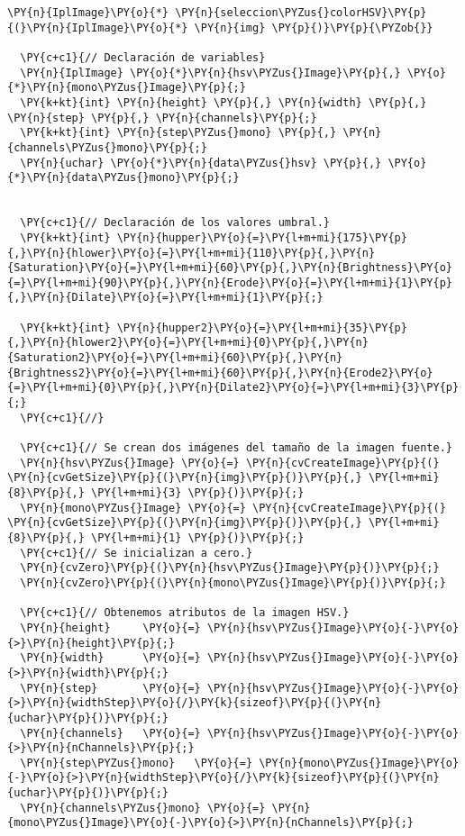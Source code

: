\begin{Verbatim}[commandchars=\\\{\}]
\PY{n}{IplImage}\PY{o}{*} \PY{n}{seleccion\PYZus{}colorHSV}\PY{p}{(}\PY{n}{IplImage}\PY{o}{*} \PY{n}{img} \PY{p}{)}\PY{p}{\PYZob{}}

  \PY{c+c1}{// Declaración de variables}
  \PY{n}{IplImage} \PY{o}{*}\PY{n}{hsv\PYZus{}Image}\PY{p}{,} \PY{o}{*}\PY{n}{mono\PYZus{}Image}\PY{p}{;}
  \PY{k+kt}{int} \PY{n}{height} \PY{p}{,} \PY{n}{width} \PY{p}{,} \PY{n}{step} \PY{p}{,} \PY{n}{channels}\PY{p}{;}
  \PY{k+kt}{int} \PY{n}{step\PYZus{}mono} \PY{p}{,} \PY{n}{channels\PYZus{}mono}\PY{p}{;}  
  \PY{n}{uchar} \PY{o}{*}\PY{n}{data\PYZus{}hsv} \PY{p}{,} \PY{o}{*}\PY{n}{data\PYZus{}mono}\PY{p}{;}


  \PY{c+c1}{// Declaración de los valores umbral.}
  \PY{k+kt}{int} \PY{n}{hupper}\PY{o}{=}\PY{l+m+mi}{175}\PY{p}{,}\PY{n}{hlower}\PY{o}{=}\PY{l+m+mi}{110}\PY{p}{,}\PY{n}{Saturation}\PY{o}{=}\PY{l+m+mi}{60}\PY{p}{,}\PY{n}{Brightness}\PY{o}{=}\PY{l+m+mi}{90}\PY{p}{,}\PY{n}{Erode}\PY{o}{=}\PY{l+m+mi}{1}\PY{p}{,}\PY{n}{Dilate}\PY{o}{=}\PY{l+m+mi}{1}\PY{p}{;}

  \PY{k+kt}{int} \PY{n}{hupper2}\PY{o}{=}\PY{l+m+mi}{35}\PY{p}{,}\PY{n}{hlower2}\PY{o}{=}\PY{l+m+mi}{0}\PY{p}{,}\PY{n}{Saturation2}\PY{o}{=}\PY{l+m+mi}{60}\PY{p}{,}\PY{n}{Brightness2}\PY{o}{=}\PY{l+m+mi}{60}\PY{p}{,}\PY{n}{Erode2}\PY{o}{=}\PY{l+m+mi}{0}\PY{p}{,}\PY{n}{Dilate2}\PY{o}{=}\PY{l+m+mi}{3}\PY{p}{;}   
  \PY{c+c1}{//}

  \PY{c+c1}{// Se crean dos imágenes del tamaño de la imagen fuente.}
  \PY{n}{hsv\PYZus{}Image} \PY{o}{=} \PY{n}{cvCreateImage}\PY{p}{(} \PY{n}{cvGetSize}\PY{p}{(}\PY{n}{img}\PY{p}{)}\PY{p}{,} \PY{l+m+mi}{8}\PY{p}{,} \PY{l+m+mi}{3} \PY{p}{)}\PY{p}{;}
  \PY{n}{mono\PYZus{}Image} \PY{o}{=} \PY{n}{cvCreateImage}\PY{p}{(} \PY{n}{cvGetSize}\PY{p}{(}\PY{n}{img}\PY{p}{)}\PY{p}{,} \PY{l+m+mi}{8}\PY{p}{,} \PY{l+m+mi}{1} \PY{p}{)}\PY{p}{;}
  \PY{c+c1}{// Se inicializan a cero.}
  \PY{n}{cvZero}\PY{p}{(}\PY{n}{hsv\PYZus{}Image}\PY{p}{)}\PY{p}{;}
  \PY{n}{cvZero}\PY{p}{(}\PY{n}{mono\PYZus{}Image}\PY{p}{)}\PY{p}{;}

  \PY{c+c1}{// Obtenemos atributos de la imagen HSV.}
  \PY{n}{height}     \PY{o}{=} \PY{n}{hsv\PYZus{}Image}\PY{o}{-}\PY{o}{>}\PY{n}{height}\PY{p}{;}
  \PY{n}{width}      \PY{o}{=} \PY{n}{hsv\PYZus{}Image}\PY{o}{-}\PY{o}{>}\PY{n}{width}\PY{p}{;}
  \PY{n}{step}       \PY{o}{=} \PY{n}{hsv\PYZus{}Image}\PY{o}{-}\PY{o}{>}\PY{n}{widthStep}\PY{o}{/}\PY{k}{sizeof}\PY{p}{(}\PY{n}{uchar}\PY{p}{)}\PY{p}{;}
  \PY{n}{channels}   \PY{o}{=} \PY{n}{hsv\PYZus{}Image}\PY{o}{-}\PY{o}{>}\PY{n}{nChannels}\PY{p}{;}
  \PY{n}{step\PYZus{}mono}   \PY{o}{=} \PY{n}{mono\PYZus{}Image}\PY{o}{-}\PY{o}{>}\PY{n}{widthStep}\PY{o}{/}\PY{k}{sizeof}\PY{p}{(}\PY{n}{uchar}\PY{p}{)}\PY{p}{;}
  \PY{n}{channels\PYZus{}mono} \PY{o}{=} \PY{n}{mono\PYZus{}Image}\PY{o}{-}\PY{o}{>}\PY{n}{nChannels}\PY{p}{;}


\end{Verbatim}
